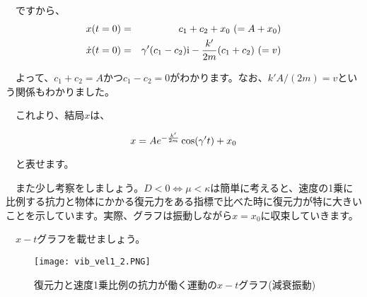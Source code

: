 \begin{enumerate}
            　ですから、
            　
            \begin{eqnarray}
                x(t=0) &=& c_1+c_2+x_0 \ (=A+x_0) \notag \\
                \dot{x}(t=0) &=& \gamma'(c_1-c_2)\mathrm{i}-\frac{k'}{2m}(c_1+c_2) \ (=v)
            \end{eqnarray}
            
            　よって、$c_1+c_2=A$かつ$c_1-c_2=0$がわかります。なお、$k'A/(2m)=v$という関係もわかりました。
            
            　これより、結局$x$は、
            
            \begin{equation}
                x = Ae^{-\frac{k'}{2m}}\cos(\gamma't)+ x_0 \notag
            \end{equation}
            
            　と表せます。
            
            　また少し考察をしましょう。$D < 0\Leftrightarrow \mu < \kappa$は簡単に考えると、速度の1乗に比例する抗力と物体にかかる復元力をある指標で比べた時に復元力が特に大きいことを示しています。実際、グラフは振動しながら$x=x_0$に収束していきます。
            
            　$x-t$グラフを載せましょう。
            \begin{figure}[!ht]
              \centering
              \texttt{[image: vib\_vel1\_2.PNG]}
              \caption{復元力と速度1乗比例の抗力が働く運動の$x-t$グラフ(減衰振動)}
              \label{fig:vib_vel1_2}
            \end{figure}
            \fi
            
            
            \begin{center}
            \end{center}
\end{enumerate}







